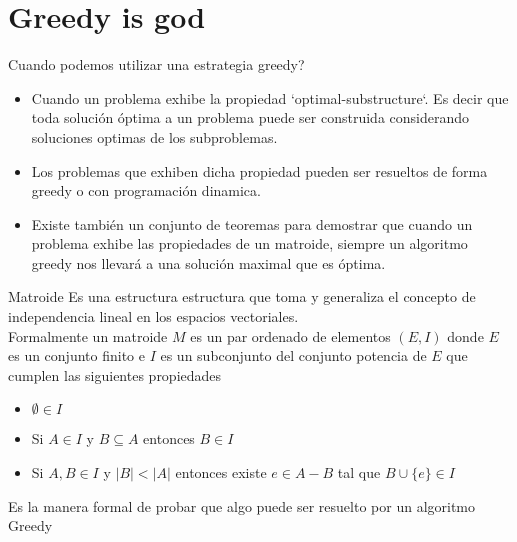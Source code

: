 \documentclass{beamer}
\begin{document}
\section{Greedy is god}
\begin{frame}{Cuando podemos utilizar una estrategia greedy?}
  \begin{itemize}
  \item Cuando un problema exhibe la propiedad ‘optimal-substructure‘.
    Es decir que toda solución óptima a un problema puede ser
    construida considerando soluciones optimas de los
    subproblemas.\pause
  \item Los problemas que exhiben dicha propiedad pueden ser resueltos
    de forma greedy o con programación dinamica.\pause
  \item Existe también un conjunto de teoremas para demostrar que
    cuando un problema exhibe las propiedades de un matroide,
    siempre un algoritmo greedy nos llevará a una solución maximal
    que es óptima.
  \end{itemize}
\end{frame}

\begin{frame}{Matroide}
  Es una estructura  estructura que toma y generaliza el concepto de
  independencia lineal en los espacios vectoriales.\\\pause
  Formalmente un matroide $M$ es un par ordenado de elementos $(E,I)$ 
  donde $E$ es un conjunto finito e $I$ es un subconjunto del conjunto
  potencia de $E$ que cumplen las siguientes propiedades
  \begin{itemize}
  \item $\emptyset \in I$
  \item Si $A \in I$ y $B \subseteq A$ entonces $B \in I$
  \item Si $A, B \in I$ y $|B| < |A|$ entonces existe $e\in A - B$ 
    tal que $B\cup \{e\}\in I$ 
  \end{itemize}\pause
  Es la manera formal de probar que algo puede ser resuelto por un algoritmo Greedy 
\end{frame}
\end{document}
